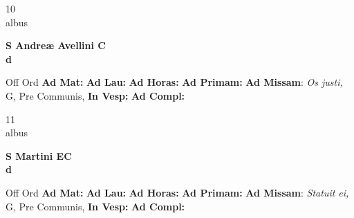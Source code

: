 \documentclass[10pt, openany]{book}
\begin{document}
    \begin{center}
        \begin{minipage}{3.5in}
            \vspace{2em}
            \begin{minipage}{0.5in}
                {\Huge 10} \\
                {\normalsize albus}
            \end{minipage}
            \begin{minipage}{3.0in}
                \textbf{ \large S Andreæ Avellini C \\
                \textnormal{\normalsize d}}

            \end{minipage}
            \begin{justify}Off Ord
                \textbf{Ad Mat: }
                \textbf{Ad Lau: }
                \textbf{Ad Horas: }
                \textbf{Ad Primam: }\textbf{Ad Missam}: \textit{Os justi,} G, Pre Communis, 
                \textbf{In Vesp: }
                \textbf{Ad Compl: }
            \end{justify}
        \end{minipage}
    \end{center}

    \begin{center}
        \begin{minipage}{3.5in}
            \vspace{2em}
            \begin{minipage}{0.5in}
                {\Huge 11} \\
                {\normalsize albus}
            \end{minipage}
            \begin{minipage}{3.0in}
                \textbf{ \large S Martini  EC \\
                \textnormal{\normalsize d}}

            \end{minipage}
            \begin{justify}Off Ord
                \textbf{Ad Mat: }
                \textbf{Ad Lau: }
                \textbf{Ad Horas: }
                \textbf{Ad Primam: }\textbf{Ad Missam}: \textit{Statuit ei,} G, Pre Communis, 
                \textbf{In Vesp: }
                \textbf{Ad Compl: }
            \end{justify}
        \end{minipage}
    \end{center}
\end{document}
